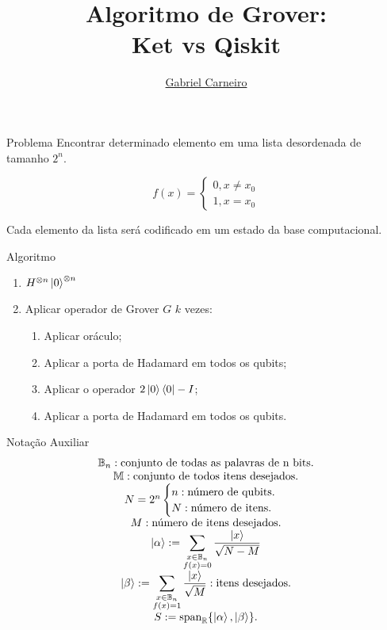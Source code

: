 \documentclass[12pt]{beamer}
\title{Algoritmo de Grover: \\ Ket vs Qiskit}
\author{\href{https://github.com/G-Carneiro}{Gabriel Carneiro}}
\begin{document}
    \begin{frame}[plain]
        \titlepage
    \end{frame}

    \begin{frame}{Problema}
        Encontrar determinado elemento em uma lista desordenada de tamanho $2^n$.

        \[
            f(x) =
            \begin{cases}
                0, x \ne x_0 \\
                1, x = x_0
            \end{cases}
        \]

        Cada elemento da lista será codificado em um estado da base computacional.
    \end{frame}

    \begin{frame}{Algoritmo}
        \begin{enumerate}
            \item $H^{\otimes n} \ket{0}^{\otimes n}$
            \item Aplicar operador de Grover $G$ $k$ vezes:
            \begin{enumerate}
                \item Aplicar oráculo;
                \item Aplicar a porta de Hadamard em todos os qubits;
                \item Aplicar o operador $2 \ket{0}\bra{0} - I$;
                \item Aplicar a porta de Hadamard em todos os qubits.
            \end{enumerate}
        \end{enumerate}
    \end{frame}

    \begin{frame}{Notação Auxiliar}
        \[
        \begin{matrix}
            \mathbb{B}_n: \text{conjunto de todas as palavras de n bits}. \\
            \mathbb{M}: \text{conjunto de todos itens desejados}. \\
            N = 2^n
            \begin{cases}
                n: \text{número de qubits}. \\
                N: \text{número de itens}.
            \end{cases} \\
            M: \text{número de itens desejados}. \\
            \ket{\alpha} := \displaystyle \sum_{\substack{x \in \mathbb{B}_n \\ f(x) = 0}} \frac{\ket{x}}{\sqrt{N - M}} \\
            \ket{\beta} := \displaystyle \sum_{\substack{x \in \mathbb{B}_n \\ f(x) = 1}} \dfrac{\ket{x}}{\sqrt{M}} : \text{itens desejados}. \\
            S := \text{span}_\mathbb{R} \{ \ket{\alpha}, \ket{\beta} \}.
        \end{matrix}
        \]
    \end{frame}
\end{document}
